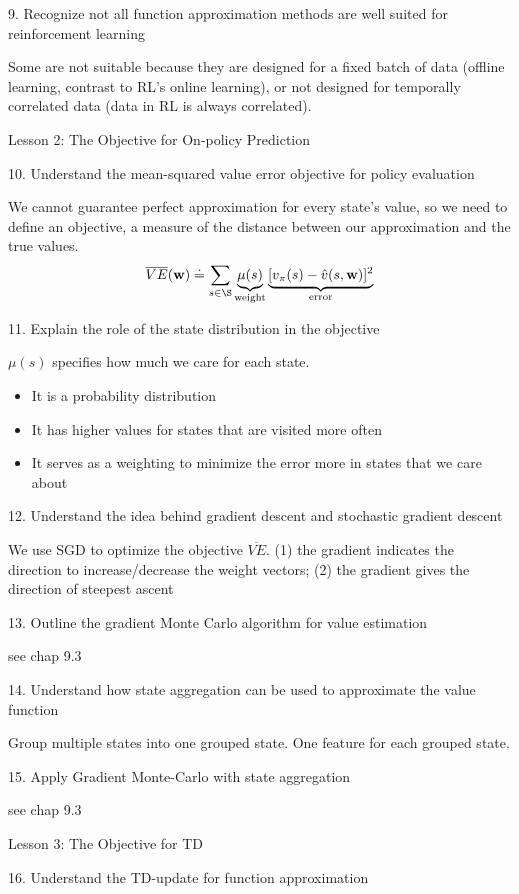 \documentclass[sutton_barto_notes.tex]{subfiles}
\begin{document}
9. Recognize not all function approximation methods are well suited for reinforcement learning 

Some are not suitable because they are designed for a fixed batch of data (offline learning, contrast to RL's online learning), or not designed for temporally correlated data (data in RL is always correlated).

Lesson 2: The Objective for On-policy Prediction 

10. Understand the mean-squared value error objective for policy evaluation 

We cannot guarantee perfect approximation for every state's value, so we need to define an objective, a measure of the distance between our approximation and the true values.
$$\overline{VE}({\bw}) \doteq \sum_{s\in\S} \underbrace{\mu(s)}_{\text{weight}} \underbrace{[v_\pi(s) - \hat{v}(s,{\bw})]^2}_{\text{error}}$$

11. Explain the role of the state distribution in the objective 

$\mu(s)$ specifies how much we care for each state.
\begin{itemize}
\item It is a probability distribution
\item It has higher values for states that are visited more often
\item It serves as a weighting to minimize the error more in states that we care about
\end{itemize}

12. Understand the idea behind gradient descent and stochastic gradient descent 

We use SGD to optimize the objective $\overline{VE}$. (1) the gradient indicates the direction to increase/decrease the weight vectors; (2) the gradient gives the direction of steepest ascent

13. Outline the gradient Monte Carlo algorithm for value estimation 

see chap 9.3

14. Understand how state aggregation can be used to approximate the value function 

Group multiple states into one grouped state. One feature for each grouped state.

15. Apply Gradient Monte-Carlo with state aggregation 

see chap 9.3

Lesson 3: The Objective for TD 

16. Understand the TD-update for function approximation 
\end{document}
